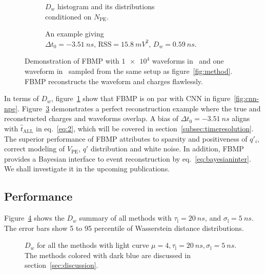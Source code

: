\begin{figure}[H]
  \begin{subfigure}[b]{.45\textwidth}
    \centering
    \resizebox{1.05\textwidth}{!}{}
    \caption{\label{fig:fbmp-npe} $D_w$ histogram and its distributions \\ conditioned on $N_{\mathrm{PE}}$.}
  \end{subfigure}
  \begin{subfigure}[b]{.55\textwidth}
    \centering
    \resizebox{\textwidth}{!}{}
    \caption{\label{fig:fbmp} An example giving \\ $\Delta{t_0}=\SI{-3.51}{ns}$, $\mathrm{RSS}=\SI{15.8}{mV^2}$, $D_w=\SI{0.59}{ns}$.}
  \end{subfigure}
  \caption{Demonstration of FBMP with $\num[retain-unity-mantissa=false]{1e4}$ waveforms in~ and one waveform in~ sampled from the same setup as figure~\ref{fig:method}.  FBMP reconstructs the waveform and charges flawlessly.}
\end{figure}
In terms of $D_w$, figure~\ref{fig:fbmp-npe} show that FBMP is on par with CNN in figure~\ref{fig:cnn-npe}.  Figure~\ref{fig:fbmp} demonstrates a perfect reconstruction example where the true and reconstructed charges and waveforms overlap.  A bias of $\Delta{t_0}=\SI{-3.51}{ns}$ aligns with $\hat{t}_\mathrm{ALL}$ in eq.~\eqref{eq:2}, which will be covered in section~\ref{subsec:timeresolution}.  The superior performance of FBMP attributes to sparsity and positiveness of $q'_i$, correct modeling of $V_\mathrm{PE}$, $q'$ distribution and white noise.  In addition, FBMP provides a Bayesian interface to event reconstruction by eq.~\eqref{eq:bayesianinter}.  We shall investigate it in the upcoming publications.
\subsection{Performance}


Figure~\ref{fig:chargesummary} shows the $D_w$ summary of all methods with $\tau_\mathrm{l}=\SI{20}{ns}$, and $\sigma_\mathrm{l}=\SI{5}{ns}$. The error bars show 5 to 95 percentile of Wasserstein distance distributions. 

\begin{figure}[H]
    \centering
    \resizebox{\textwidth}{!}{}
    \caption{\label{fig:chargesummary} $D_w$ for all the methods with light curve $\mu=4, \tau_\mathrm{l}=\SI{20}{ns}, \sigma_\mathrm{l}=\SI{5}{ns}$. The methods colored with dark blue are discussed in section~\ref{sec:discussion}. }
\end{figure}

